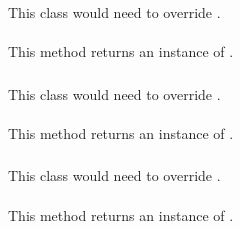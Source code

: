 \subsubsection{} \label{Classes:Metrics:StatementCoverage}

This class would need to override .

\paragraph{} \label{Classes:Metrics:StatementCoverage:getInstance}
This method returns an instance of .

\subsubsection{} \label{Classes:Metrics:BranchCoverage}

This class would need to override .

\paragraph{} \label{Classes:Metrics:BranchCoverage:getInstance}
This method returns an instance of .

\subsubsection{} \label{Classes:Metrics:ConditionalCoverage}

This class would need to override .

\paragraph{} \label{Classes:Metrics:ConditionalCoverage:getInstance}
This method returns an instance of .

